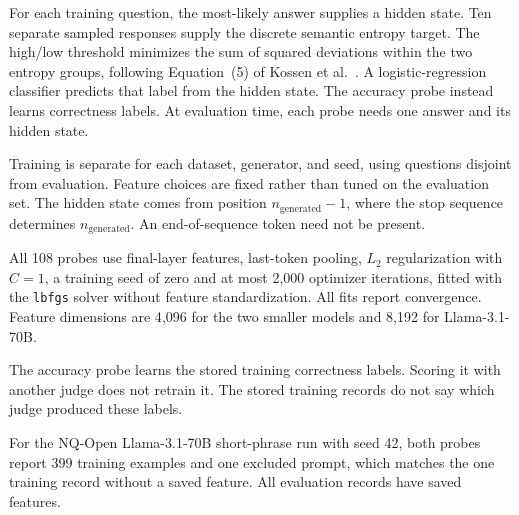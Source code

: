 For each training question, the most-likely answer supplies a hidden state.
Ten separate sampled responses supply the discrete semantic entropy target.
The high/low threshold minimizes the sum of squared deviations within the
two entropy groups, following Equation~(5) of
Kossen et al.~\cite{kossen_semantic_entropy_probes_2024}. A logistic-regression
classifier predicts that label from the hidden state. The accuracy probe
instead learns correctness labels. At evaluation time, each probe needs one
answer and its hidden state.

Training is separate for each dataset, generator, and seed, using questions
disjoint from evaluation. Feature choices are fixed rather than tuned on the
evaluation set. The hidden state comes from position
$n_{\mathrm{generated}}-1$, where the stop sequence determines
$n_{\mathrm{generated}}$. An end-of-sequence token need not be present.

All 108 probes use final-layer features, last-token pooling,
$L_2$ regularization with $C=1$, a training seed of zero and at most 2{,}000
optimizer iterations, fitted with the \texttt{lbfgs} solver without feature
standardization. All fits report convergence. Feature dimensions are 4{,}096
for the two smaller models and 8{,}192 for Llama-3.1-70B.

The accuracy probe learns the stored training correctness labels. Scoring it
with another judge does not retrain it. The stored training records do not
say which judge produced these labels.

For the NQ-Open Llama-3.1-70B short-phrase run with seed 42, both probes report
399 training examples and one excluded prompt, which matches the one training
record without a saved feature. All evaluation records have saved features.
